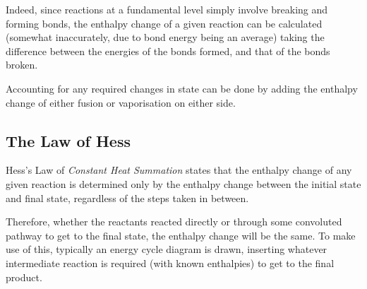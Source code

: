 
		Indeed, since reactions at a fundamental level simply involve breaking and forming bonds, the enthalpy change of a given reaction
		can be calculated (somewhat inaccurately, due to bond energy being an average) taking the difference between the energies of the
		bonds formed, and that of the bonds broken.


		Accounting for any required changes in state can be done by adding the enthalpy change of either fusion or vaporisation on either
		side.







	\pagebreak
	\subsection{The Law of Hess}

		Hess's Law of \textit{Constant Heat Summation} states that the enthalpy change of any given reaction is determined only by the
		enthalpy change between the initial state and final state, regardless of the steps taken in between.

		Therefore, whether the reactants reacted directly or through some convoluted pathway to get to the final state, the enthalpy
		change will be the same. To make use of this, typically an energy cycle diagram is drawn, inserting whatever intermediate reaction
		is required (with known enthalpies) to get to the final product.



